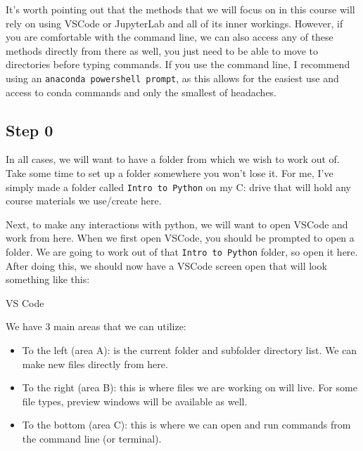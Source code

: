 \documentclass[
  letterpaper,
  DIV=11,
  numbers=noendperiod]{scrreprt}
\providecommand{\tightlist}{%
  \setlength{\itemsep}{0pt}\setlength{\parskip}{0pt}}\usepackage{longtable,booktabs,array}
\begin{document}
\begin{tcolorbox}[enhanced jigsaw, rightrule=.15mm, opacitybacktitle=0.6, colback=white, toprule=.15mm, colframe=quarto-callout-tip-color-frame, bottomtitle=1mm, bottomrule=.15mm, arc=.35mm, coltitle=black, breakable, title=\textcolor{quarto-callout-tip-color}{\faLightbulb}\hspace{0.5em}{Tip: Using the command line}, titlerule=0mm, opacityback=0, colbacktitle=quarto-callout-tip-color!10!white, left=2mm, toptitle=1mm, leftrule=.75mm]
It's worth pointing out that the methods that we will focus on in this
course will rely on using VSCode or JupyterLab and all of its inner
workings. However, if you are comfortable with the command line, we can
also access any of these methods directly from there as well, you just
need to be able to move to directories before typing commands. If you
use the command line, I recommend using an
\texttt{anaconda\ powershell\ prompt}, as this allows for the easiest
use and access to conda commands and only the smallest of headaches.
\end{tcolorbox}

\hypertarget{step-0}{%
\subsection{Step 0}\label{step-0}}

In all cases, we will want to have a folder from which we wish to work
out of. Take some time to set up a folder somewhere you won't lose it.
For me, I've simply made a folder called \texttt{Intro\ to\ Python} on
my C: drive that will hold any course materials we use/create here.

Next, to make any interactions with python, we will want to open VSCode
and work from here. When we first open VSCode, you should be prompted to
open a folder. We are going to work out of that
\texttt{Intro\ to\ Python} folder, so open it here. After doing this, we
should now have a VSCode screen open that will look something like this:

VS Code

We have 3 main areas that we can utilize:

\begin{itemize}
\tightlist
\item
  To the left (area A): is the current folder and subfolder directory
  list. We can make new files directly from here.
\item
  To the right (area B): this is where files we are working on will
  live. For some file types, preview windows will be available as well.
\item
  To the bottom (area C): this is where we can open and run commands
  from the command line (or terminal).
\end{itemize}
\end{document}
